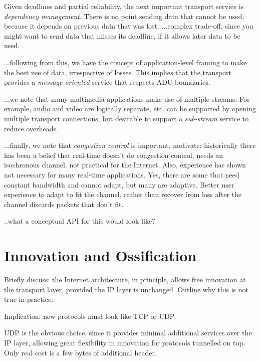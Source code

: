 \documentclass{sig-alternate-05-2015}
\begin{document}
Given deadlines and partial reliability, the next important transport
service is \emph{dependency management}. There is no point sending data
that cannot be used, because it depends on previous data that was lost. 
...complex trade-off, since you might want to send data that misses its 
   deadline, if it allows later data to be used. 

...following from this, we have the concept of application-level framing
   to make the best use of data, irrespective of losses. This implies that
   the transport provides a \emph{message oriented} service that respects
   ADU boundaries. 

...we note that many multimedia applications make use of multiple streams. 
   For example, audio and video are logically separate, etc.
   can be supported by opening multiple transport connections, but
   desirable to support a \emph{sub-stream} service to reduce overheads.

...finally, we note that \emph{congestion control} is important. 
   motivate: historically there has been a belief that real-time doesn't 
   do congestion control, needs an isochronous channel. 
   not practical for the Internet. 
   Also, experience has shown not necessary for many real-time applications.
   Yes, there are some that need constant bandwidth and cannot adapt, but
   many are adaptive. 
   Better user experience to adapt to fit the channel, rather than recover
   from loss after the channel discards packets that don't fit. 


..what a conceptual API for this would look like?

\section{Innovation and Ossification}
\label{sec:ossification}

Briefly discuss: the Internet architecture, in principle, allows free
innovation at the transport layer, provided the IP layer is unchanged. 
Outline why this is not true in practice. 

Implication: new protocols must look like TCP or UDP.

UDP is the obvious choice, since it provides minimal additional services
over the IP layer, allowing great flexibility in innovation for protocols
tunnelled on top. Only real cost is a few bytes of additional header.
\end{document}
